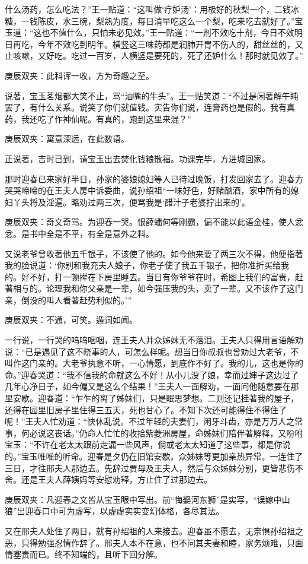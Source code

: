 \begin{parag}
什么汤药，怎么吃法？”王一贴道：“这叫做‘疗妒汤’：用极好的秋梨一个，二钱冰糖，一钱陈皮，水三碗，梨熟为度，每日清早吃这么一个梨，吃来吃去就好了。”宝玉道：“这也不值什么，只怕未必见效。”王一贴道：“一剂不效吃十剂，今日不效明日再吃，今年不效吃到明年。横竖这三味药都是润肺开胃不伤人的，甜丝丝的，又止咳嗽，又好吃。吃过一百岁，人横竖是要死的，死了还妒什么！那时就见效了。”\begin{note}庚辰双夹：此科诨一收，方为奇趣之至。\end{note}说著，宝玉茗烟都大笑不止，骂“油嘴的牛头”。王一贴笑道：“不过是闲著解午盹罢了，有什么关系。说笑了你们就值钱。实告你们说，连膏药也是假的。我有真药，我还吃了作神仙呢。有真的，跑到这里来混？”\begin{note}庚辰双夹：寓意深远，在此数语。\end{note}正说著，吉时已到，请宝玉出去焚化钱粮散福。功课完毕，方进城回家。
\end{parag}


\begin{parag}
    那时迎春已来家好半日，孙家的婆娘媳妇等人已待过晚饭，打发回家去了。迎春方哭哭啼啼的在王夫人房中诉委曲，说孙绍祖“一味好色，好赌酗酒，家中所有的媳妇丫头将及淫遍。略劝过两三次，便骂我是‘醋汁子老婆拧出来的’。\begin{note}庚辰双夹：奇文奇骂。为迎春一哭。恨薛蟠何等刚霸，偏不能以此语金桂，使人忿忿。是书中全是不平，有全是意外之料。\end{note}又说老爷曾收著他五千银子，不该使了他的。如今他来要了两三次不得，他便指著我的脸说道：‘你别和我充夫人娘子，你老子使了我五千银子，把你准折买给我的。好不好，打一顿撵在下房里睡去。当日有你爷爷在时，希图上我们的富贵，赶著相与的。论理我和你父亲是一辈，如今强压我的头，卖了一辈。又不该作了这门亲，倒没的叫人看著赶势利似的。’”\begin{note}庚辰双夹：不通，可笑。遁词如闻。\end{note}一行说，一行哭的呜呜咽咽，连王夫人并众姊妹无不落泪。王夫人只得用言语解劝说：“已是遇见了这不晓事的人，可怎么样呢。想当日你叔叔也曾劝过大老爷，不叫作这门亲的。大老爷执意不听，一心情愿，到底作不好了。我的儿，这也是你的命。”迎春哭道：“我不信我的命就这么不好！从小儿没了娘，幸而过婶子这边过了几年心净日子，如今偏又是这么个结果！”王夫人一面解劝，一面问他随意要在那里安歇。迎春道：“乍乍的离了姊妹们，只是眠思梦想。二则还记挂著我的屋子，还得在园里旧房子里住得三五天，死也甘心了。不知下次还可能得住不得住了呢！”王夫人忙劝道：“快休乱说。不过年轻的夫妻们，闲牙斗齿，亦是万万人之常事，何必说这丧话。”仍命人忙忙的收拾紫菱洲房屋，命姊妹们陪伴著解释，又吩咐宝玉：“不许在老太太跟前走漏一些风声，倘或老太太知道了这些事，都是你说的。”宝玉唯唯的听命。迎春是夕仍在旧馆安歇。众姊妹等更加亲热异常。一连住了三日，才往邢夫人那边去。先辞过贾母及王夫人，然后与众姊妹分别，更皆悲伤不舍。还是王夫人薛姨妈等安慰劝释，方止住了过那边去。\begin{note}庚辰双夹：凡迎春之文皆从宝玉眼中写出。前“悔娶河东狮”是实写，“误嫁中山狼”出迎春口中可为虚写，以虚虚实实变幻体格，各尽其法。\end{note}又在邢夫人处住了两日，就有孙绍祖的人来接去。迎春虽不愿去，无奈惧孙绍祖之恶，只得勉强忍情作辞了。邢夫人本不在意，也不问其夫妻和睦，家务烦难，只面情塞责而已。终不知端的，且听下回分解。
\end{parag}


